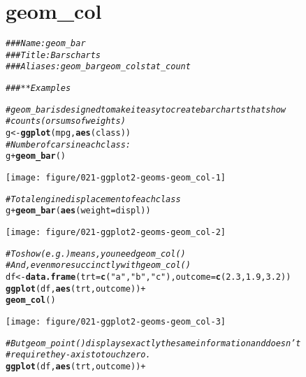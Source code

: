 \documentclass[a4paper,titlepage]{tufte-handout}\usepackage[]{graphicx}\usepackage[]{color}
\makeatletter
\def\maxwidth{ %
  \ifdim\Gin@nat@width>\linewidth
    \linewidth
  \else
    \Gin@nat@width
  \fi
}
\newcommand{\hlnum}[1]{\textcolor[rgb]{0.686,0.059,0.569}{#1}}%
\newcommand{\hlstr}[1]{\textcolor[rgb]{0.192,0.494,0.8}{#1}}%
\newcommand{\hlcom}[1]{\textcolor[rgb]{0.678,0.584,0.686}{\textit{#1}}}%
\newcommand{\hlopt}[1]{\textcolor[rgb]{0,0,0}{#1}}%
\newcommand{\hlstd}[1]{\textcolor[rgb]{0.345,0.345,0.345}{#1}}%
\newcommand{\hlkwb}[1]{\textcolor[rgb]{0.69,0.353,0.396}{#1}}%
\newcommand{\hlkwc}[1]{\textcolor[rgb]{0.333,0.667,0.333}{#1}}%
\newcommand{\hlkwd}[1]{\textcolor[rgb]{0.737,0.353,0.396}{\textbf{#1}}}%
\newenvironment{kframe}{%
 \def\at@end@of@kframe{}%
 \ifinner\ifhmode%
  \def\at@end@of@kframe{\end{minipage}}%
  \begin{minipage}{\columnwidth}%
 \fi\fi%
 \def\FrameCommand##1{\hskip\@totalleftmargin \hskip-\fboxsep
 \colorbox{shadecolor}{##1}\hskip-\fboxsep
     \hskip-\linewidth \hskip-\@totalleftmargin \hskip\columnwidth}%
 \MakeFramed {\advance\hsize-\width
   \@totalleftmargin\z@ \linewidth\hsize
   \@setminipage}}%
 {\par\unskip\endMakeFramed%
 \at@end@of@kframe}
\newenvironment{knitrout}{}{} %
\makeatother
\begin{document}
\section{geom\_col}

\begin{knitrout}
\color{fgcolor}\begin{kframe}
\begin{alltt}
\hlcom{### Name: geom_bar}
\hlcom{### Title: Bars charts}
\hlcom{### Aliases: geom_bar geom_col stat_count}

\hlcom{### ** Examples}

\hlcom{# geom_bar is designed to make it easy to create bar charts that show}
\hlcom{# counts (or sums of weights)}
\hlstd{g} \hlkwb{<-} \hlkwd{ggplot}\hlstd{(mpg,} \hlkwd{aes}\hlstd{(class))}
\hlcom{# Number of cars in each class:}
\hlstd{g} \hlopt{+} \hlkwd{geom_bar}\hlstd{()}
\end{alltt}
\end{kframe}
\texttt{[image: figure/021-ggplot2-geoms-geom\_col-1]} 
\begin{kframe}\begin{alltt}
\hlcom{# Total engine displacement of each class}
\hlstd{g} \hlopt{+} \hlkwd{geom_bar}\hlstd{(}\hlkwd{aes}\hlstd{(}\hlkwc{weight} \hlstd{= displ))}
\end{alltt}
\end{kframe}
\texttt{[image: figure/021-ggplot2-geoms-geom\_col-2]} 
\begin{kframe}\begin{alltt}
\hlcom{# To show (e.g.) means, you need geom_col()}
\hlcom{# And, even more succinctly with geom_col()}
\hlstd{df} \hlkwb{<-} \hlkwd{data.frame}\hlstd{(}\hlkwc{trt} \hlstd{=} \hlkwd{c}\hlstd{(}\hlstr{"a"}\hlstd{,} \hlstr{"b"}\hlstd{,} \hlstr{"c"}\hlstd{),} \hlkwc{outcome} \hlstd{=} \hlkwd{c}\hlstd{(}\hlnum{2.3}\hlstd{,} \hlnum{1.9}\hlstd{,} \hlnum{3.2}\hlstd{))}
\hlkwd{ggplot}\hlstd{(df,} \hlkwd{aes}\hlstd{(trt, outcome))} \hlopt{+}
  \hlkwd{geom_col}\hlstd{()}
\end{alltt}
\end{kframe}
\texttt{[image: figure/021-ggplot2-geoms-geom\_col-3]} 
\begin{kframe}\begin{alltt}
\hlcom{# But geom_point() displays exactly the same information and doesn't}
\hlcom{# require the y-axis to touch zero.}
\hlkwd{ggplot}\hlstd{(df,} \hlkwd{aes}\hlstd{(trt, outcome))} \hlopt{+}

\end{alltt}
\end{kframe}
\end{knitrout}
\end{document}
